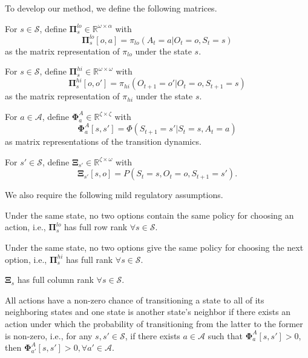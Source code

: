 To develop our method, we define the following matrices.
\begin{definition}
    For $s \in \mathcal{S}$, define $\bm{\Pi}^{lo}_s\in\mathbb{R}^{\omega\times\alpha}$ with $$\bm{\Pi}^{lo}_s[o,a] = \pi_{lo}(A_t=a\vert O_t=o,S_t=s)$$ as the matrix representation of $\pi_{lo}$ under the state $s$.
\end{definition}

\begin{definition}
    For $s \in \mathcal{S}$, define $\bm{\Pi}^{hi}_s\in\mathbb{R}^{\omega\times\omega}$ with $$\bm{\Pi}^{hi}_s[o,o'] = \pi_{hi}(O_{t+1} = o'\vert O_t = o,S_{t+1}=s)$$
    as the matrix representation of $\pi_{hi}$ under the state $s$.
\end{definition}

\begin{definition}
    For $a \in \mathcal{A}$, define $\bm{\Phi}^A_a\in\mathbb{R}^{\zeta\times\zeta}$ with
    \[
        \bm{\Phi}^A_a[s,s']=\Phi(S_{t+1} = s'\vert S_t = s, A_t=a)
    \]
    as matrix representations of the transition dynamics.
\end{definition}

\begin{definition}
    For $s'\in\mathcal{S}$, define $\bm{\Xi}_{s'}\in\mathbb{R}^{\zeta\times\omega}$ with $$\bm{\Xi}_{s'}[s,o] = P(S_t=s,O_t=o,S_{t+1}=s').$$
\end{definition}

We also require the following mild regulatory assumptions.
\begin{assumption}\label{asu:pilo}
Under the same state, no two options contain the same policy for choosing an action, i.e., $\bm{\Pi}^{lo}_s$ has full row rank $\forall s\in\mathcal{S}$.
\end{assumption}

\begin{assumption}\label{asu:pihi}
Under the same state, no two options give the same policy for choosing the next option, i.e., $\bm{\Pi}^{hi}_s$ has full rank $\forall s\in\mathcal{S}$. 
\end{assumption}

\begin{assumption}\label{asu:invertibility}
$\bm{\Xi}_s$ has full column rank $\forall s\in\mathcal{S}$.
\end{assumption}

\begin{assumption}\label{asu:noisy_transition}
All actions have a non-zero chance of transitioning a state to all of its neighboring states and one state is another state's neighbor if there exists an action under which the probability of transitioning from the latter to the former is non-zero, i.e., for any $s,s'\in\mathcal{S}$, if there exists $a\in\mathcal{A}$ such that $\bm{\Phi}^A_a[s,s']>0$, then $\bm{\Phi}^A_{a'}[s,s']>0,\forall a'\in\mathcal{A}.$
\end{assumption}

